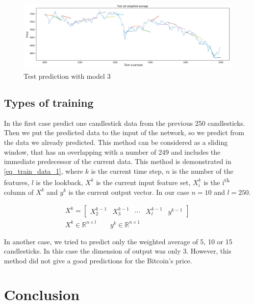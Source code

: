\documentclass[conference]{IEEEtran}
\begin{document}
\begin{figure}[!ht]
  \centering
  \includegraphics[width=170mm, keepaspectratio]{figures/test_pred_3.png}
  \caption{Test prediction with model 3}
  \label{fig:TestPred3}
\end{figure}

\subsection{Types of training}
\label{TypesOfTraining}

In the first case predict one candlestick data from the previous 250 candlesticks. Then we put the predicted data to the input of the network, so we predict from the data we already predicted. This method can be considered as a sliding window, that has an overlapping with a number of 249 and includes the immediate predecessor of the current data. This method is demonstrated in \ref{eq_train_data_1}, where $k$ is the current time step, $n$ is the number of the features, $l$ is the lookback, $X^k$ is the current input feature set, $X^k_i$ is the i\textsuperscript{th} column of $X^k$ and $y^k$ is the current output vector. In our case $n=10$ and $l=250$.

\begin{equation}
\label{eq_train_data_1}
  \begin{gathered}
    X^k = \begin{bmatrix} X_{2}^{k-1} & X_{3}^{k-1} & \cdots & X_{l}^{k-1} & y^{k-1} \end{bmatrix} \\[5mm]
    X^k \in \mathbb{R}^{n\times l} \qquad
    y^k \in \mathbb{R}^{n\times 1}
  \end{gathered}
\end{equation}

In another case, we tried to predict only the weighted average of 5, 10 or 15 candlesticks. In this case the dimension of output was only 3. However, this method did not give a good predictions for the Bitcoin's price.

\section{Conclusion}
\end{document}
